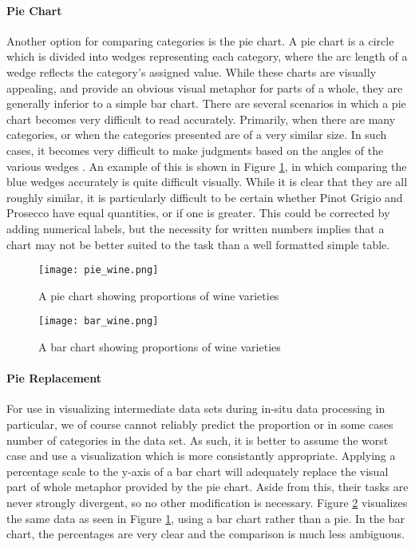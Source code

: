 \paragraph{Pie Chart}
Another option for comparing categories is the pie chart. A pie chart is a circle which is divided into wedges representing each category, where the arc length of a wedge reflects the category's assigned value. While these charts are visually appealing, and provide an obvious visual metaphor for parts of a whole, they are generally inferior to a simple bar chart. There are several scenarios in which a pie chart becomes very difficult to read accurately. Primarily, when there are many categories, or when the categories presented are of a very similar size. In such cases, it becomes very difficult to make judgments based on the angles of the various wedges \cite{Robbins2005}. An example of this is shown in Figure \ref{fig:winepie}, in which comparing the blue wedges accurately is quite difficult visually. While it is clear that they are all roughly similar, it is particularly difficult to be certain whether Pinot Grigio and Prosecco have equal quantities, or if one is greater. This could be corrected by adding numerical labels, but the necessity for written numbers implies that a chart may not be better suited to the task than a well formatted simple table. 

\begin{figure}
	\centering
	\texttt{[image: pie\_wine.png]}
	\caption{A pie chart showing proportions of wine varieties \cite{Few2007}}
	\label{fig:winepie}
\end{figure}

\begin{figure}
	\centering
	\texttt{[image: bar\_wine.png]}
	\caption{A bar chart showing proportions of wine varieties \cite{Few2007}}
	\label{fig:winebar}
\end{figure}

\paragraph{Pie Replacement}
For use in visualizing intermediate data sets during in-situ data processing in particular, we of course cannot reliably predict the proportion or in some cases number of categories in the data set. As such, it is better to assume the worst case and use a visualization which is more consistantly appropriate. Applying a percentage scale to the y-axis of a bar chart will adequately replace the visual part of whole metaphor provided by the pie chart. Aside from this, their tasks are never strongly divergent, so no other modification is necessary. Figure \ref{fig:winebar} visualizes the same data as seen in Figure \ref{fig:winepie}, using a bar chart rather than a pie. In the bar chart, the percentages are very clear and the comparison is much less ambiguous.

